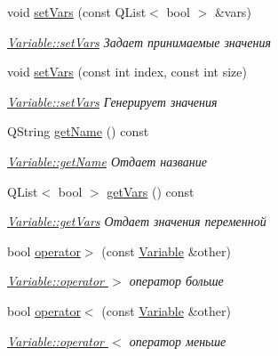 \begin{DoxyCompactItemize}
void \hyperlink{class_variable_ae6ac554c0382b43f9a3e37c6382d4471}{set\+Vars} (const Q\+List$<$ bool $>$ \&vars)
\begin{DoxyCompactList}\small\item\em \hyperlink{class_variable_ae6ac554c0382b43f9a3e37c6382d4471}{Variable\+::set\+Vars} Задает принимаемые значения \end{DoxyCompactList}\item 
void \hyperlink{class_variable_a1f2f14a77dc0dbe91e6bd285afa67fc4}{set\+Vars} (const int index, const int size)
\begin{DoxyCompactList}\small\item\em \hyperlink{class_variable_ae6ac554c0382b43f9a3e37c6382d4471}{Variable\+::set\+Vars} Генерирует значения \end{DoxyCompactList}\item 
Q\+String \hyperlink{class_variable_a7e2bd08aff707fb67d67ce1914e9bb48}{get\+Name} () const
\begin{DoxyCompactList}\small\item\em \hyperlink{class_variable_a7e2bd08aff707fb67d67ce1914e9bb48}{Variable\+::get\+Name} Отдает название \end{DoxyCompactList}\item 
Q\+List$<$ bool $>$ \hyperlink{class_variable_a43a45b7c410b176f3240ac1630495c8d}{get\+Vars} () const
\begin{DoxyCompactList}\small\item\em \hyperlink{class_variable_a43a45b7c410b176f3240ac1630495c8d}{Variable\+::get\+Vars} Отдает значения переменной \end{DoxyCompactList}\item 
bool \hyperlink{class_variable_a94991de2c5fd8fd5a66b74f726f0c645}{operator$>$} (const \hyperlink{class_variable}{Variable} \&other)
\begin{DoxyCompactList}\small\item\em \hyperlink{class_variable_a94991de2c5fd8fd5a66b74f726f0c645}{Variable\+::operator $>$} оператор больше \end{DoxyCompactList}\item 
bool \hyperlink{class_variable_ac0aa608ee2a38525351a6a5d902a466f}{operator$<$} (const \hyperlink{class_variable}{Variable} \&other)
\begin{DoxyCompactList}\small\item\em \hyperlink{class_variable_ac0aa608ee2a38525351a6a5d902a466f}{Variable\+::operator $<$} оператор меньше \end{DoxyCompactList}\end{DoxyCompactItemize}


